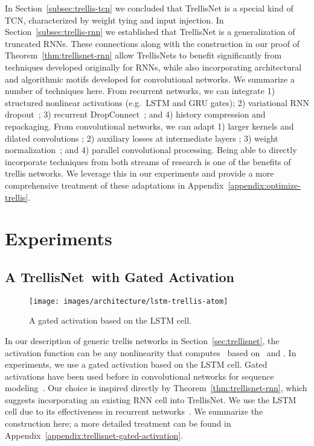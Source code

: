 \documentclass{article} \usepackage{iclr2019_conference,times}
\newcommand{\model}{TrellisNet}
\begin{document}
In Section~\ref{subsec:trellis-tcn} we concluded that TrellisNet is a special kind of TCN, characterized by weight tying and input injection. In Section~\ref{subsec:trellis-rnn} we established that TrellisNet is a generalization of truncated RNNs. These connections along with the construction in our proof of Theorem~\ref{thm:trellisnet-rnn} allow TrellisNets to benefit significantly from techniques developed originally for RNNs, while also incorporating architectural and algorithmic motifs developed for convolutional networks.
We summarize a number of techniques here. From recurrent networks, we can integrate
1) structured nonlinear activations (e.g.\ LSTM and GRU gates);
2) variational RNN dropout~\citep{gal2016dropout};
3) recurrent DropConnect~\citep{merityRegOpt}; and
4) history compression and repackaging.
From convolutional networks, we can adapt
1) larger kernels and dilated convolutions \citep{dilatedConv};
2) auxiliary losses at intermediate layers \citep{lee2015deeply,xie2015holistically};
3) weight normalization~\citep{Salimans2016}; and
4) parallel convolutional processing.
Being able to directly incorporate techniques from both streams of research is one of the benefits of trellis networks. We leverage this in our experiments and provide a more comprehensive treatment of these adaptations in Appendix~\ref{appendix:optimize-trellis}.




\section{Experiments}
\label{sec:experiments}
\vspace{-.05in}

\subsection{A \model~with Gated Activation}
\label{subsec:lstm-trellis}

\begin{wrapfigure}[14]{l}{0.32\textwidth}
\vspace{-3mm}
\centering
    \texttt{[image: images/architecture/lstm-trellis-atom]}
\vspace{-3mm}
    \caption{A gated activation based on the LSTM cell.}
    \label{fig:lstm-trellis-atom}
    \vspace{-3mm}
\end{wrapfigure}
In our description of generic trellis networks in Section~\ref{sec:trellisnet}, the activation function  can be any nonlinearity that computes \small\normalsize~based on \small\normalsize~and \small\normalsize. In experiments, we use a gated activation based on the LSTM cell.
Gated activations have been used before in convolutional networks for sequence modeling~\citep{waveNet,dauphinGatedConv}.
Our choice is inspired directly by Theorem~\ref{thm:trellisnet-rnn}, which suggests incorporating an existing RNN cell into TrellisNet. We use the LSTM cell due to its effectiveness in recurrent networks~\citep{jozefowicz2015empirical,greffOdyssey,Melis2018}. We summarize the construction here; a more detailed treatment can be found in Appendix~\ref{appendix:trellisnet-gated-activation}.
\end{document}
